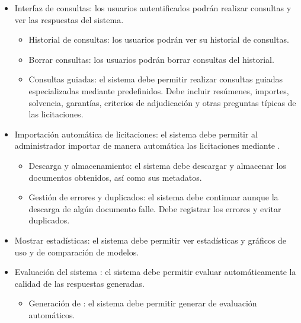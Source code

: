 \begin{itemize}
\begin{itemize}
		\item {} Sesiones: el sistema debe gestionar las sesiones de los usuarios de forma segura.
		\item {} Roles: el sistema debe permitir asignar a los usuarios el rol de administradores o usuarios normales.
		\item {} Administradores: los administradores deben poder añadir usuarios, eliminarlos y cambiar su rol.
		\item {} Edición de datos de usuario: los usuarios deben poder editar sus datos.
		\item {} Recuperación de contraseña: los usuarios deben poder cambiar su contraseña utilizando su correo.
	\end{itemize}
	\item {} Interfaz de consultas: los usuarios autentificados podrán realizar consultas y ver las respuestas del sistema.
	\begin{itemize}
	\tightlist
		\item {} Historial de consultas: los usuarios podrán ver su historial de consultas.
		\item {} Borrar consultas: los usuarios podrán borrar consultas del historial.
		\item {} Consultas guiadas: el sistema debe permitir realizar consultas guiadas especializadas mediante  predefinidos. Debe incluir resúmenes, importes, solvencia, garantías, criterios de adjudicación y otras preguntas típicas de las licitaciones. 
	\end{itemize}
	\item {} Importación automática de licitaciones: el sistema debe permitir al administrador importar de manera automática las licitaciones mediante .
	\begin{itemize}
	\tightlist
		\item {} Descarga y almacenamiento: el sistema debe descargar y almacenar los documentos obtenidos, así como sus metadatos.
		\item {} Gestión de errores y duplicados: el sistema debe continuar aunque la descarga de algún documento falle. Debe registrar los errores y evitar duplicados.
	\end{itemize}
	\item {} Mostrar estadísticas: el sistema debe permitir ver estadísticas y gráficos de uso y de comparación de modelos.
	\item {} Evaluación del sistema : el sistema debe permitir evaluar automáticamente la calidad de las respuestas generadas. 
	\begin{itemize}
	\tightlist
		\item {} Generación de : el sistema debe permitir generar  de evaluación automáticos.
	\end{itemize}
\end{itemize}

